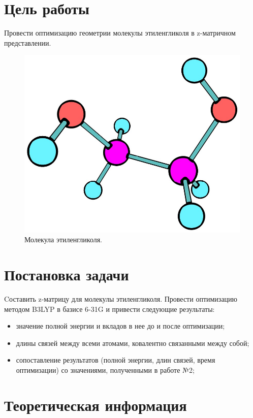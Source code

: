 \section{Цель работы}
Провести оптимизацию геометрии молекулы этиленгликоля в z-матричном представлении.

\begin{figure}[H]
\centering
\captionsetup{justification=centering}
\includegraphics[scale=0.4]{fig/0.jpg}
\caption{Молекула этиленгликоля.}
\end{figure}

\newpage
\section{Постановка задачи}
Cоставить z-матрицу для молекулы этиленгликоля. Провести оптимизацию методом B3LYP в базисе 6-31G и привести следующие результаты: 
\begin{itemize}
    \item значение полной энергии и вкладов в нее до и после оптимизации;
    \item длины связей между всеми атомами, ковалентно связанными между собой;
    \item сопоставление результатов (полной энергии, длин связей, время оптимизации) со значениями, полученными в работе №2;
\end{itemize}

\newpage
\section{Теоретическая информация}
